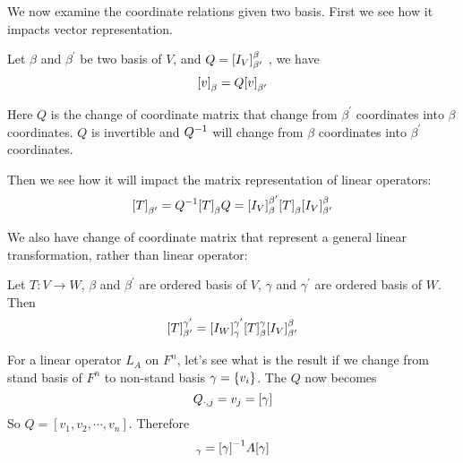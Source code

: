 We now examine the coordinate relations given two basis. First we see how it impacts vector representation. 
\begin{theorem}
    Let $\beta$ and $\beta^{\prime}$ be two basis of $V$, and $Q=\coordinate{I_V}_{\beta^\prime}^\beta$ , we have 
\begin{equation}
    \coordinate{v}_\beta = Q \coordinate{v}_{\beta^\prime}
\end{equation}    

Here $Q$ is the change of coordinate matrix that change from $\beta^\prime$ coordinates into $\beta$ coordinates. $Q$ is invertible and ${Q}^{-1}$ will change from $\beta$ coordinates into $\beta^\prime$ coordinates. 

Then we see how it will impact the matrix representation of linear operators:
\begin{equation}\label{change_of_coordinate_formula}
    \coordinate{T}_{\beta^\prime} = \inverse{Q} \coordinate{T}_{\beta} Q = \coordinate{I_V}_\beta^{\beta^\prime} \coordinate{T}_\beta \coordinate{I_V}_{\beta^\prime}^\beta
\end{equation}
\end{theorem}


We also have change of coordinate matrix that represent a general linear transformation, rather than linear operator:

\begin{theorem} \label{specialchangeofcoordinates}
	Let $T:V\rightarrow W$, $\beta$ and $\beta^\prime$ are ordered basis of $V$, $\gamma$ and $\gamma^\prime$ are ordered basis of $W$. Then
	\begin{equation}
		\coordinate{T}_{\beta^\prime}^{\gamma^\prime} = \coordinate{I_W}_\gamma^{\gamma^\prime} \coordinate{T}_\beta^\gamma \coordinate{I_V}_{\beta^\prime}^\beta
	\end{equation}
\end{theorem}


\begin{example}
    For a linear operator $L_A$ on $F^n$, let's see what is the result if we change from stand basis of $F^n$ to non-stand basis $\gamma = \set{v_i}$. The $Q$ now becomes
    \begin{equation*}
        {Q}_{\cdot, {j}} = v_j = [\gamma]
    \end{equation*}
    So $Q = [v_1, v_2, \cdots, v_n]$. Therefore
    \begin{equation}
        [L_A]_\gamma = \inverse{[\gamma]} A [\gamma]
    \end{equation}
\end{example}




